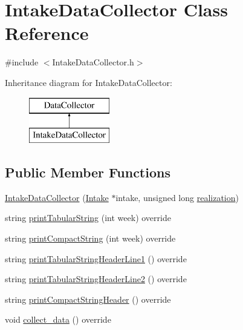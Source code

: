 \hypertarget{classIntakeDataCollector}{}\section{Intake\+Data\+Collector Class Reference}
\label{classIntakeDataCollector}


{\ttfamily \#include $<$Intake\+Data\+Collector.\+h$>$}

Inheritance diagram for Intake\+Data\+Collector\+:\begin{figure}[H]
\begin{center}
\leavevmode
\includegraphics[height=2.000000cm]{classIntakeDataCollector}
\end{center}
\end{figure}
\subsection*{Public Member Functions}
\begin{DoxyCompactItemize}
\item 
\mbox{\hyperlink{classIntakeDataCollector_a2ab4a81bec74a370c60c78609627e807}{Intake\+Data\+Collector}} (\mbox{\hyperlink{classIntake}{Intake}} $\ast$intake, unsigned long \mbox{\hyperlink{classDataCollector_a9ef2887466fe3123aa19ef956a219b96}{realization}})
\item 
string \mbox{\hyperlink{classIntakeDataCollector_ada2b88b7a05455cf6f2eebf82d37b3c5}{print\+Tabular\+String}} (int week) override
\item 
string \mbox{\hyperlink{classIntakeDataCollector_ac39a40726fd4fe887425b24a10f04034}{print\+Compact\+String}} (int week) override
\item 
string \mbox{\hyperlink{classIntakeDataCollector_ae17ab7e6c75e77f5981f6a682597bb5c}{print\+Tabular\+String\+Header\+Line1}} () override
\item 
string \mbox{\hyperlink{classIntakeDataCollector_a2855eb8eed71649309bd4d9336f258c0}{print\+Tabular\+String\+Header\+Line2}} () override
\item 
string \mbox{\hyperlink{classIntakeDataCollector_a42d56dd08e57a7e6e48812a2ab522439}{print\+Compact\+String\+Header}} () override
\item 
void \mbox{\hyperlink{classIntakeDataCollector_aed1610e5419465b35041b05b9f60c212}{collect\+\_\+data}} () override
\end{DoxyCompactItemize}

